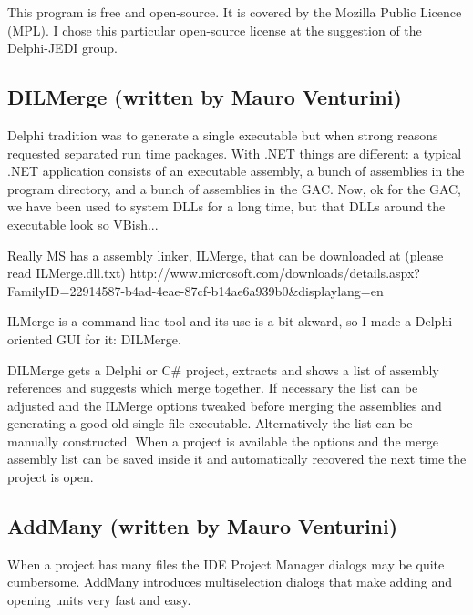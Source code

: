 \documentclass{article}
\begin{document}
This program is free and open-source. It is covered by the Mozilla Public
Licence (MPL). I chose this particular open-source license at the suggestion of
the Delphi-JEDI group.

%

\subsection{DILMerge (written by Mauro Venturini)}
Delphi tradition was to generate a single executable but when strong reasons
requested separated run time packages. With .NET things are different: a
typical .NET application consists of an executable assembly, a bunch of
assemblies in the program directory, and a bunch of assemblies in the GAC. Now,
ok for the GAC, we have been used to system DLLs for a long time, but that DLLs
around the executable look so VBish...

Really MS has a assembly linker, ILMerge, that can be downloaded at (please
read ILMerge.dll.txt)
http://www.microsoft.com/down\-loads/de\-tails.aspx?Fa\-mi\-ly\-ID=22914587-b4ad-4eae-87cf-b14ae6a939b0\&displaylang=en

ILMerge is a command line tool and its use is a bit akward, so I made a Delphi
oriented GUI for it: DILMerge.

DILMerge gets a Delphi or C\# project, extracts and shows a list of assembly
references and suggests which merge together. If necessary the list can be
adjusted and the ILMerge options tweaked before merging the assemblies and
generating a good old single file executable. Alternatively the list can be
manually constructed. When a project is available the options and the merge
assembly list can be saved inside it and automatically recovered the next time
the project is open.

\subsection{AddMany (written by Mauro Venturini)}
\label{sec:addmany}
When a project has many files the IDE Project Manager dialogs may be quite
cumbersome. AddMany introduces multiselection dialogs that make adding and
opening units very fast and easy.
\end{document}
